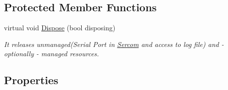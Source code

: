   \subsection*{Protected Member Functions}
  \begin{DoxyCompactItemize}
  \item 
  virtual void \hyperlink{class_elib_1_1_epuck_aa08e40a007e38ad47254d8f43f035798}{Dispose} (bool disposing)
  \begin{DoxyCompactList}\small\item\em It releases unmanaged(Serial Port in \hyperlink{class_elib_1_1_sercom}{Sercom} and access to log file) and -\/ optionally -\/ managed resources. \item\end{DoxyCompactList}\end{DoxyCompactItemize}
  \subsection*{Properties}

